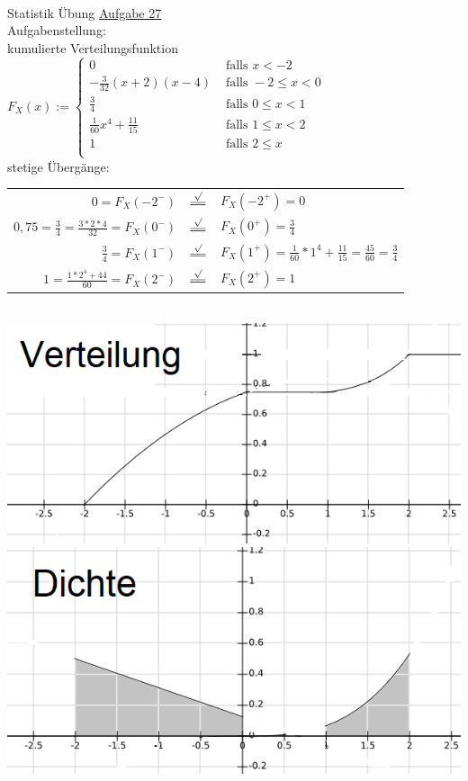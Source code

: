 \documentclass[12pt]{article} %
\newcommand{\eqgood}{\overset{\surd}{=\joinrel=}}
\newcommand{\aufgabe}[1]{{\huge Statistik Übung \underline{Aufgabe #1}}\\[3.5ex]  }
\begin{document}
\- \dotfill
\\[4ex]
\aufgabe{27}
Aufgabenstellung: \\
kumulierte Verteilungsfunktion $F_X(x) := 
\begin{cases}
0 
& \text{ falls } x<-2 \\
-\frac{3}{32}(x+2)(x-4) 
& \text{ falls } -2 \leq x<0\\
\frac{3}{4}
& \text{ falls } 0 \leq x<1\\
\frac{1}{60}x^4 + \frac{11}{15}
& \text{ falls } 1 \leq x<2\\
1
& \text{ falls } 2 \leq x\\
\end{cases}$\\
stetige Übergänge: \\
\begin{tabular}{rcl}
$0 = F_X(-2^{-})$ & $\eqgood$ &  $F_X(-2^{+}) = 0$\\
$0,75 = \frac{3}{4} = \frac{3 * 2 * 4}{32} = F_X(0^{-})$ & $\eqgood$ &  $F_X(0^{+}) = \frac{3}{4}$\\
$\frac{3}{4} = F_X(1^{-})$ & $\eqgood$ &   $F_X(1^{+}) = \frac{1}{60} * 1^4 + \frac{11}{15} = \frac{45}{60} = \frac{3}{4}$\\
$1 = \frac{1*2^4+44}{60} = F_X(2^{-})$ & $\eqgood$ &   $F_X(2^{+}) = 1$\\
\end{tabular}\\
\includegraphics[scale=1]{A27F.png}\\
\includegraphics[scale=1]{A27D.png}\\
\end{document}
